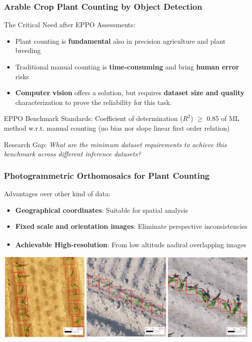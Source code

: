 \documentclass[aspectratio=43]{beamer}
\renewcommand{\thefootnote}{\arabic{footnote}}
\newcommand{\citeKraus}{Kraus, K. Photogrammetry: Geometry from Images and Laser Scans. De Gruyter: Berlin, Germany, 2011}
\newcommand{\fcite}[1]{%
  \stepcounter{footnote}%
  \textsuperscript{\thefootnote}%
  \footnotetext[\value{footnote}]{#1}%
}
\begin{document}
\begin{frame}
    \frametitle{Arable Crop Plant Counting by Object Detection}
    
    \begin{block}{The Critical Need after EPPO Assessments:}
        \begin{itemize}
            \item Plant counting is \textbf{fundamental} also in precision agriculture and plant breeding
            \item Traditional manual counting is \textbf{time-consuming} and bring \textbf{human error} risks
            \item \textbf{Computer vision} offers a solution, but requires \textbf{dataset size and quality} characterization to prove the reliability for this task.
        \end{itemize}
    \end{block}
    
    \begin{exampleblock}{EPPO Benchmark Standards:}
        Coefficient of determination ($R^2$) $\geq$ 0.85 of ML method w.r.t. manual counting (no bias nor slope linear first order relation)
    \end{exampleblock}
    
    \begin{alertblock}{Research Gap:}
        \textit{What are the minimum dataset requirements to achieve this benchmark across different inference datasets?}
    \end{alertblock}
\end{frame}

\begin{frame}
    \frametitle{Photogrammetric Orthomosaics for Plant Counting}
    
    \begin{block}{Advantages over other kind of data:}
        \begin{itemize}
            \item \textbf{Geographical coordinates}\small : Suitable for spatial analysis
            \item \textbf{Fixed scale and orientation images}\small : Eliminate perspective inconsistencies
            \item \textbf{Achievable High-resolution}\small : From low altitude nadiral overlapping images\fcite{\citeKraus}
        \end{itemize}
    \end{block}

    \includegraphics[width=1\textwidth]{Imgs/dataset_example.png}
\end{frame}
\end{document}
